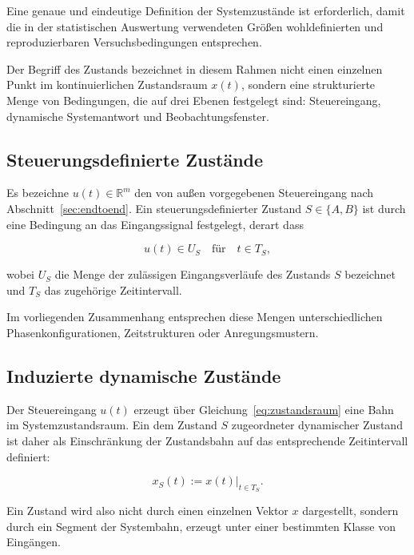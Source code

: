 \documentclass[12pt,a4paper]{report}
\begin{document}
Eine genaue und eindeutige Definition der Systemzustände ist erforderlich,
damit die in der statistischen Auswertung verwendeten Größen
wohldefinierten und reproduzierbaren Versuchsbedingungen entsprechen.

Der Begriff des Zustands bezeichnet in diesem Rahmen nicht einen einzelnen
Punkt im kontinuierlichen Zustandsraum $x(t)$, sondern eine strukturierte
Menge von Bedingungen, die auf drei Ebenen festgelegt sind: Steuereingang,
dynamische Systemantwort und Beobachtungsfenster.

\subsection{Steuerungsdefinierte Zustände}

Es bezeichne $u(t) \in \mathbb{R}^{m}$ den von außen vorgegebenen
Steuereingang nach Abschnitt~\ref{sec:endtoend}. Ein steuerungsdefinierter
Zustand $S \in \{A, B\}$ ist durch eine Bedingung an das Eingangssignal
festgelegt, derart dass

\begin{equation}
u(t) \in U_S \quad \text{für} \quad t \in T_S,
\label{eq:steuerzustand}
\end{equation}

wobei $U_S$ die Menge der zulässigen Eingangsverläufe des Zustands $S$
bezeichnet und $T_S$ das zugehörige Zeitintervall.

Im vorliegenden Zusammenhang entsprechen diese Mengen unterschiedlichen
Phasenkonfigurationen, Zeitstrukturen oder Anregungsmustern.

\subsection{Induzierte dynamische Zustände}

Der Steuereingang $u(t)$ erzeugt über
Gleichung~\eqref{eq:zustandsraum} eine Bahn im Systemzustandsraum. Ein
dem Zustand $S$ zugeordneter dynamischer Zustand ist daher als
Einschränkung der Zustandsbahn auf das entsprechende Zeitintervall
definiert:

\begin{equation}
x_S(t) := x(t)\big|_{t \in T_S}.
\label{eq:dynzustand}
\end{equation}

Ein Zustand wird also nicht durch einen einzelnen Vektor $x$ dargestellt,
sondern durch ein Segment der Systembahn, erzeugt unter einer bestimmten
Klasse von Eingängen.
\end{document}
